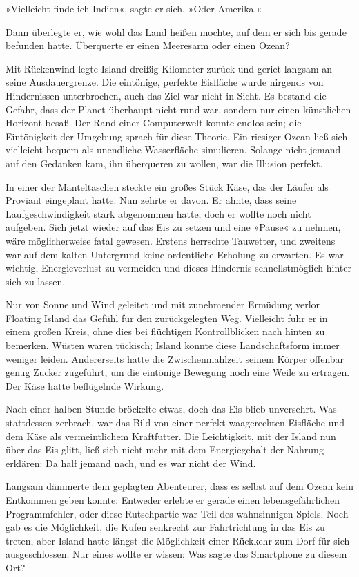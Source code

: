 »Vielleicht finde ich Indien«, sagte er sich. »Oder Amerika.«

Dann überlegte er, wie wohl das Land heißen mochte, auf dem er sich bis gerade befunden hatte. Überquerte er einen Meeresarm oder einen Ozean?

Mit Rückenwind legte Island dreißig Kilometer zurück und geriet langsam an seine Ausdauergrenze. Die eintönige, perfekte Eisfläche wurde nirgends von Hindernissen unterbrochen, auch das Ziel war nicht in Sicht. Es bestand die Gefahr, dass der Planet überhaupt nicht rund war, sondern nur einen künstlichen Horizont besaß. Der Rand einer Computerwelt konnte endlos sein; die Eintönigkeit der Umgebung sprach für diese Theorie. Ein riesiger Ozean ließ sich vielleicht bequem als unendliche Wasserfläche simulieren. Solange nicht jemand auf den Gedanken kam, ihn überqueren zu wollen, war die Illusion perfekt.

In einer der Manteltaschen steckte ein großes Stück Käse, das der Läufer als Proviant eingeplant hatte. Nun zehrte er davon. Er ahnte, dass seine Laufgeschwindigkeit stark abgenommen hatte, doch er wollte noch nicht aufgeben. Sich jetzt wieder auf das Eis zu setzen und eine »Pause« zu nehmen, wäre möglicherweise fatal gewesen. Erstens herrschte Tauwetter, und zweitens war auf dem kalten Untergrund keine ordentliche Erholung zu erwarten. Es war wichtig, Energieverlust zu vermeiden und dieses Hindernis schnellstmöglich hinter sich zu lassen.

Nur von Sonne und Wind geleitet und mit zunehmender Ermüdung verlor Floating Island das Gefühl für den zurückgelegten Weg. Vielleicht fuhr er in einem großen Kreis, ohne dies bei flüchtigen Kontrollblicken nach hinten zu bemerken. Wüsten waren tückisch; Island konnte diese Landschaftsform immer weniger leiden. Andererseits hatte die Zwischenmahlzeit seinem Körper offenbar genug Zucker zugeführt, um die eintönige Bewegung noch eine Weile zu ertragen. Der Käse hatte beflügelnde Wirkung.

Nach einer halben Stunde bröckelte etwas, doch das Eis blieb unversehrt. Was stattdessen zerbrach, war das Bild von einer perfekt waagerechten Eisfläche und dem Käse als vermeintlichem Kraftfutter. Die Leichtigkeit, mit der Island nun über das Eis glitt, ließ sich nicht mehr mit dem Energiegehalt der Nahrung erklären: Da half jemand nach, und es war nicht der Wind.

Langsam dämmerte dem geplagten Abenteurer, dass es selbst auf dem Ozean kein Entkommen geben konnte: Entweder erlebte er gerade einen lebensgefährlichen Programmfehler, oder diese Rutschpartie war Teil des wahnsinnigen Spiels. Noch gab es die Möglichkeit, die Kufen senkrecht zur Fahrtrichtung in das Eis zu treten, aber Island hatte längst die Möglichkeit einer Rückkehr zum Dorf für sich ausgeschlossen. Nur eines wollte er wissen: Was sagte das Smartphone zu diesem Ort?

